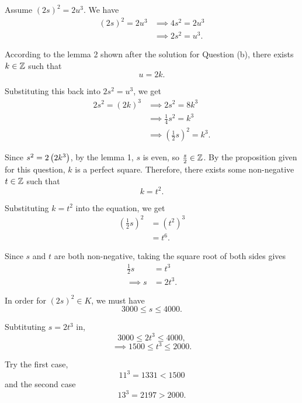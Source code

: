 \begin{enumerate}[label = (\alph*)]
\begin{solution}
Assume $(2s)^2 = 2u^3$.
We have
\begin{align*}
    (2s)^2 = 2u^3
    &\implies 4s^2 = 2u^3 \\
    &\implies 2s^2 = u^3.
\end{align*}

According to the lemma 2 shown after the solution for Question (b), there exists
$k \in \mathbb{Z}$ such that
\begin{equation*}
    u = 2k.
\end{equation*}

Substituting this back into $2s^2 = u^3$, we get
\begin{align*}
    2s^2 = (2k)^3
    &\implies 2s^2 = 8k^3 \\
    &\implies \frac{1}{4}s^2 = k^3 \\
    &\implies \left(\frac{1}{2}s\right)^2 = k^3.
\end{align*}

Since $s^2 = 2\left(2k^3\right)$, by the lemma 1, $s$ is even, so $\frac{s }{2 } \in \mathbb{Z}$. 
By the proposition given for this question, $k$ is a perfect square. 
Therefore, there exists some non-negative $t \in \mathbb{Z}$ such that
\begin{equation*}
    k = t^2.
\end{equation*}

Substituting $k = t^2$ into the equation, we get
\begin{align*}
    \left(\frac{1}{2}s\right)^2
    &= (t^2)^3 \\
    &= t^6.
\end{align*}

Since $s$ and $t$ are both non-negative, taking the square root of both sides gives
\begin{align*}
    \frac{1}{2}s &= t^3 \\
    \implies s &= 2t^3.
\end{align*}

In order for $(2s)^2 \in K$, we must have
\begin{equation*}
    3000 \leq s \leq 4000.
\end{equation*}

Subtituting $s=2t^3$ in,
\begin{equation*}
    3000 \leq 2t^3 \leq 4000,
\end{equation*}
\begin{equation*}
    \implies 1500 \leq t^3 \leq 2000.
\end{equation*}

Try the first case,
\begin{equation*}
    11^3 = 1331 < 1500
\end{equation*}
and the second case
\begin{equation*}
    13^3 = 2197 > 2000.
\end{equation*}


\end{solution}
\end{enumerate}
